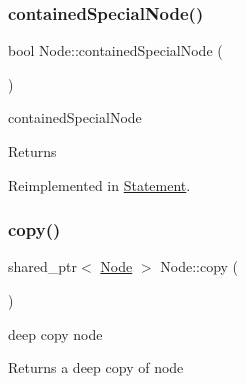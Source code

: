 \mbox{\label{class_node_ac76ac1cc0fd7376ca329f3e8279ebe1e}} 
\subsubsection{\texorpdfstring{contained\+Special\+Node()}{containedSpecialNode()}}
{\footnotesize\ttfamily bool Node\+::contained\+Special\+Node (\begin{DoxyParamCaption}{ }\end{DoxyParamCaption})\hspace{0.3cm}{\ttfamily [virtual]}}



contained\+Special\+Node 

\begin{DoxyReturn}{Returns}

\end{DoxyReturn}


Reimplemented in \hyperlink{class_statement_a482a663d073d2601fa1759a5e651c240}{Statement}.

\mbox{\label{class_node_a0d22a418a622a24852610fd51910c5eb}} 
\subsubsection{\texorpdfstring{copy()}{copy()}}
{\footnotesize\ttfamily shared\+\_\+ptr$<$ \hyperlink{class_node}{Node} $>$ Node\+::copy (\begin{DoxyParamCaption}{ }\end{DoxyParamCaption})\hspace{0.3cm}{\ttfamily [virtual]}}



deep copy node 

\begin{DoxyReturn}{Returns}
a deep copy of node 
\end{DoxyReturn}


